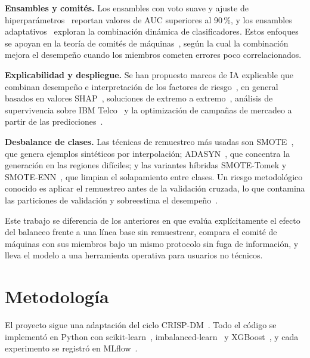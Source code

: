 \documentclass[conference]{IEEEtran}
\begin{document}
\textbf{Ensambles y comités.} Los ensambles con voto suave y ajuste de hiperparámetros~\cite{acisc2026softvoting,jcs2026developing} reportan valores de AUC superiores al 90\,\%, y los ensambles adaptativos~\cite{arxiv2024adaptive} exploran la combinación dinámica de clasificadores. Estos enfoques se apoyan en la teoría de comités de máquinas~\cite{dietterich2000ensemble,kuncheva2014combining}, según la cual la combinación mejora el desempeño cuando los miembros cometen errores poco correlacionados.

\textbf{Explicabilidad y despliegue.} Se han propuesto marcos de IA explicable que combinan desempeño e interpretación de los factores de riesgo~\cite{plos2026xai}, en general basados en valores SHAP~\cite{lundberg2017shap}, soluciones de extremo a extremo~\cite{cogent2026endtoend}, análisis de supervivencia sobre IBM Telco~\cite{icatam2024survival} y la optimización de campañas de mercadeo a partir de las predicciones~\cite{arxiv2026marketing}.

\textbf{Desbalance de clases.} Las técnicas de remuestreo más usadas son SMOTE~\cite{chawla2002smote}, que genera ejemplos sintéticos por interpolación; ADASYN~\cite{he2008adasyn}, que concentra la generación en las regiones difíciles; y las variantes híbridas SMOTE-Tomek y SMOTE-ENN~\cite{batista2004balancing}, que limpian el solapamiento entre clases. Un riesgo metodológico conocido es aplicar el remuestreo antes de la validación cruzada, lo que contamina las particiones de validación y sobreestima el desempeño~\cite{cawley2010overfitting}.

Este trabajo se diferencia de los anteriores en que evalúa explícitamente el efecto del balanceo frente a una línea base sin remuestrear, compara el comité de máquinas con sus miembros bajo un mismo protocolo sin fuga de información, y lleva el modelo a una herramienta operativa para usuarios no técnicos.

\section{Metodología}\label{sec:metodologia}

El proyecto sigue una adaptación del ciclo CRISP-DM~\cite{shearer2000crisp}. Todo el código se implementó en Python con scikit-learn~\cite{pedregosa2011sklearn}, imbalanced-learn~\cite{lemaitre2017imblearn} y XGBoost~\cite{chen2016xgboost}, y cada experimento se registró en MLflow~\cite{zaharia2018mlflow}.
\end{document}
